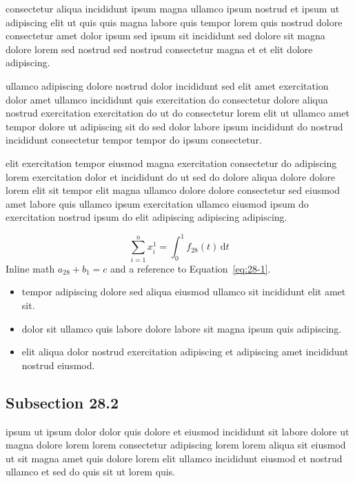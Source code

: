 \documentclass{article}
\begin{document}
consectetur aliqua incididunt ipsum magna ullamco ipsum nostrud et ipsum ut adipiscing elit ut quis quis magna labore quis tempor lorem quis nostrud dolore consectetur amet dolor ipsum sed ipsum sit incididunt sed dolore sit magna dolore lorem sed nostrud sed nostrud consectetur magna et et elit dolore adipiscing.

ullamco adipiscing dolore nostrud dolor incididunt sed elit amet exercitation dolor amet ullamco incididunt quis exercitation do consectetur dolore aliqua nostrud exercitation exercitation do ut do consectetur lorem elit ut ullamco amet tempor dolore ut adipiscing sit do sed dolor labore ipsum incididunt do nostrud incididunt consectetur tempor tempor do ipsum consectetur.

elit exercitation tempor eiusmod magna exercitation consectetur do adipiscing lorem exercitation dolor et incididunt do ut sed do dolore aliqua dolore dolore lorem elit sit tempor elit magna ullamco dolore dolore consectetur sed eiusmod amet labore quis ullamco ipsum exercitation ullamco eiusmod ipsum do exercitation nostrud ipsum do elit adipiscing adipiscing adipiscing.

\begin{equation}\label{eq:28-1}
  \sum_{i=1}^{n} x_i^{1} = \int_0^1 f_{28}(t)\,\mathrm{d}t
\end{equation}
Inline math $a_{28} + b_{1} = c$ and a reference to Equation~\eqref{eq:28-1}.

\begin{itemize}
  \item tempor adipiscing dolore sed aliqua eiusmod ullamco sit incididunt elit amet sit.
  \item dolor sit ullamco quis labore dolore labore sit magna ipsum quis adipiscing.
  \item elit aliqua dolor nostrud exercitation adipiscing et adipiscing amet incididunt nostrud eiusmod.
\end{itemize}

\subsection{Subsection 28.2}\label{sec:28-2}
ipsum ut ipsum dolor dolor quis dolore et eiusmod incididunt sit labore dolore ut magna dolore lorem lorem consectetur adipiscing lorem lorem aliqua sit eiusmod ut sit magna amet quis dolore lorem elit ullamco incididunt eiusmod et nostrud ullamco et sed do quis sit ut lorem quis.
\end{document}

